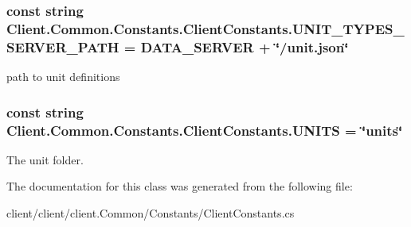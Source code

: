\hypertarget{classClient_1_1Common_1_1Constants_1_1ClientConstants_a7a52dd583176369742f5f05e3da82bb7}{}
\subsubsection[{U\+N\+I\+T\+\_\+\+T\+Y\+P\+E\+S\+\_\+\+S\+E\+R\+V\+E\+R\+\_\+\+P\+A\+T\+H}]{\setlength{\rightskip}{0pt plus 5cm}const string Client.\+Common.\+Constants.\+Client\+Constants.\+U\+N\+I\+T\+\_\+\+T\+Y\+P\+E\+S\+\_\+\+S\+E\+R\+V\+E\+R\+\_\+\+P\+A\+T\+H = {\bf D\+A\+T\+A\+\_\+\+S\+E\+R\+V\+E\+R} + \char`\"{}/unit.\+json\char`\"{}}\label{classClient_1_1Common_1_1Constants_1_1ClientConstants_a7a52dd583176369742f5f05e3da82bb7}


path to unit definitions 

\hypertarget{classClient_1_1Common_1_1Constants_1_1ClientConstants_aba7bdfaf79e97fe67cca425d84574d40}{}
\subsubsection[{U\+N\+I\+T\+S}]{\setlength{\rightskip}{0pt plus 5cm}const string Client.\+Common.\+Constants.\+Client\+Constants.\+U\+N\+I\+T\+S = \char`\"{}units\char`\"{}}\label{classClient_1_1Common_1_1Constants_1_1ClientConstants_aba7bdfaf79e97fe67cca425d84574d40}


The unit folder. 



The documentation for this class was generated from the following file\+:\begin{DoxyCompactItemize}
\item 
client/client/client.\+Common/\+Constants/Client\+Constants.\+cs\end{DoxyCompactItemize}
